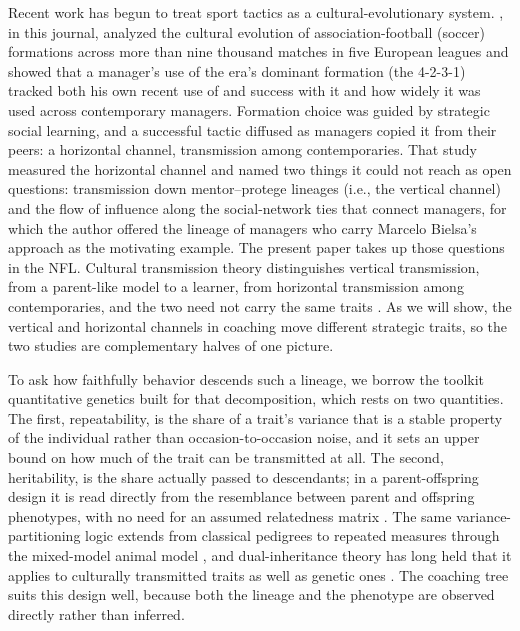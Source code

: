 \documentclass[
  journal=ehs,
  manuscript=article,
  year=2026,
  volume=8,
]{cup-journal}
\begin{document}
Recent work has begun to treat sport tactics as a cultural-evolutionary system.
\textcite{mesoudi2020}, in this journal, analyzed the cultural evolution of
association-football (soccer) formations across more than nine thousand matches in
five European leagues and showed that a manager's use of the era's dominant formation
(the 4-2-3-1) tracked both his own recent use of and success with it and how widely it
was used across contemporary managers. Formation choice was guided by strategic social
learning, and a successful tactic diffused as managers copied it from their peers: a
horizontal channel, transmission among contemporaries. That study measured the
horizontal channel and named two things it could not reach as open questions:
transmission down mentor--protege lineages (i.e., the vertical channel) and the flow
of influence along the social-network ties that connect managers, for which the author
offered the lineage of managers who carry Marcelo Bielsa's approach as the motivating
example. The present paper takes up those questions in the NFL. Cultural transmission
theory distinguishes vertical transmission, from a parent-like model to a learner,
from horizontal transmission among contemporaries, and the two need not carry the same
traits \parencite{cavallisforza1981, boydricherson1985}. As we will show, the vertical
and horizontal channels in coaching move different strategic traits, so the two
studies are complementary halves of one picture.

To ask how faithfully behavior descends such a lineage, we borrow the toolkit
quantitative genetics built for that decomposition, which rests on two quantities. The
first, repeatability, is the share of a trait's variance that is a stable property of
the individual rather than occasion-to-occasion noise, and it sets an upper bound on
how much of the trait can be transmitted at all. The second, heritability, is the
share actually passed to descendants; in a parent-offspring design it is read directly
from the resemblance between parent and offspring phenotypes, with no need for an
assumed relatedness matrix \parencite{falconermackay1996}. The same
variance-partitioning logic extends from classical pedigrees to repeated measures
through the mixed-model animal model \parencite{wilson2010, nakagawa2010}, and
dual-inheritance theory has long held that it applies to culturally transmitted traits
as well as genetic ones \parencite{cavallisforza1981}. The coaching tree suits this
design well, because both the lineage and the phenotype are observed directly rather
than inferred.
\end{document}
